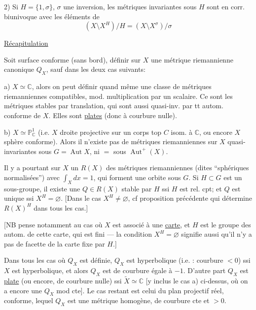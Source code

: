  2) Si $H=\{1,\sigma\}$, $\sigma$ une inversion, les métriques invariantes sous $H$ sont en corr. biunivoque avec les éléments de
\[
(X\setminus X^H)/H=(X\setminus X^\sigma)/\sigma
\]

\uline{Récapitulation}

Soit  surface conforme (sans bord),  définir sur $X$ une métrique riemannienne canonique $Q_X$, sauf dans les deux cas suivants:

a) $X\simeq\mathbb C$, alors on peut définir quand même une classe de métriques riemanniennes compatibles, mod. multiplication par un scalaire. Ce sont les métriques stables par translation, qui sont aussi quasi-inv. par tt autom. conforme de $X$. Elles sont \uline{plates} (donc à courbure nulle).

b) $X\simeq\mathbb P^1_{\mathbb C}$ (i.e. $X$ droite projective sur un corps top $C$ isom. à $\mathbb C$, ou encore $X$ sphère conforme). Alors il n'existe pas de métriques riemanniennes sur $X$ quasi-invariantes sous $G=\operatorname{Aut}X$, ni $=$ sous $\operatorname{Aut}^+(X)$.

 Il y a pourtant sur $X$ un  $R(X)$ des métriques riemanniennes (dites ``sphériques normalisées'') avec $\int_X dx=1$, qui forment une orbite sous $G$. Si $H\subset G$ est un sous-groupe, il existe une $Q\in R(X)$ stable par $H$ ssi $H$ est rel. cpt; et $Q$ est unique ssi $X^H=\varnothing$. [Dans le cas $X^H\ne\varnothing$, cf proposition précédente qui détermine $R(X)^H$ dans tous les cas.]

[NB  pense notamment au cas où $X$ est associé à une \uline{carte}, et $H$ est le groupe des autom. de cette carte, qui est fini --- la condition $X^H=\varnothing$ signifie aussi qu'il n'y a pas de facette de la carte fixe par $H$.]

Dans tous les cas où $Q_X$ est définie, $Q_X$ est hyperbolique (i.e. : courbure $<0$) ssi $X$ est hyperbolique, et alors $Q_X$ est de courbure  égale à $-1$. D'autre part $Q_X$ est \uline{plate}  (ou encore, de courbure nulle) ssi $\widetilde X\simeq\mathbb C$ [y inclus le cas a) ci-dessus, où on a encore une $Q_X$ mod cte]. Le cas restant est celui du plan projectif réel, conforme,   lequel $Q_X$ est une métrique homogène, de courbure cte  et $>0$.


